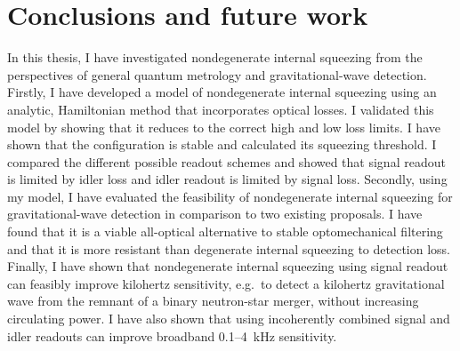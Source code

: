 \chapter{Conclusions and future work}
\label{chp:future_work_and_conclusions}

In this thesis, I have investigated nondegenerate internal squeezing from the perspectives of general quantum metrology	and gravitational-wave detection.
Firstly, I have developed a model of nondegenerate internal squeezing using an analytic, Hamiltonian method that incorporates optical losses. I validated this model by showing that it reduces to the correct high and low loss limits. I have shown that the configuration is stable and calculated its squeezing threshold. I compared the different possible readout schemes and showed that signal readout is limited by idler loss and idler readout is limited by signal loss.
Secondly, using my model, I have evaluated the feasibility of nondegenerate internal squeezing for gravitational-wave detection in comparison to two existing proposals. I have found that it is a viable all-optical alternative to stable optomechanical filtering and that it is more resistant than degenerate internal squeezing to detection loss. %
Finally, I have shown that nondegenerate internal squeezing using signal readout can feasibly improve kilohertz sensitivity, e.g.\ to detect a kilohertz gravitational wave from the remnant of a binary neutron-star merger, without increasing circulating power. %
I have also shown that using incoherently combined signal and idler readouts can improve broadband 0.1--4~kHz sensitivity. %
